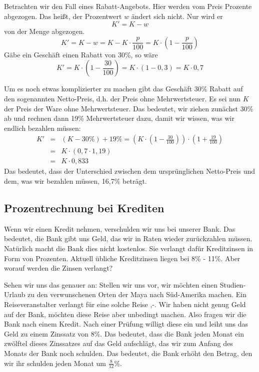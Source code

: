 Betrachten wir den Fall eines Rabatt-Angebots. Hier werden vom Preis Prozente abgezogen. Das heißt, der Prozentwert $w$ ändert sich nicht. Nur wird er
\[
K' = K-w
\]
von der Menge abgezogen.
\[
K' = K-w = K-K\cdot \frac{p}{100} = K\cdot \left(1-\frac{p}{100}\right) 
\]
Gäbe ein Geschäft einen Rabatt von 30\%, so wäre 
\[
K' = K\cdot \left(1-\frac{30}{100}\right) = K\cdot (1-0,3) = K\cdot 0,7
\]

Um es noch etwas komplizierter zu machen gibt das Geschäft 30\% Rabatt auf den sogenannten Netto-Preis, d.h. der Preis ohne Mehrwertsteuer. Es sei nun $K$ der Preis der Ware ohne Mehrwertsteuer. Das bedeutet, wir ziehen zunächst 30\% ab und rechnen dann 19\% Mehrwertsteuer dazu, damit wir wissen, was wir endlich bezahlen müssen:
\begin{eqnarray*}
K' &=& (K-30\% ) + 19\% = \left( K\cdot \left( 1-\frac{30}{100} \right) \right)\cdot \left( 1+\frac{19}{100} \right)\\
&=& K\cdot \left( 0,7 \cdot 1,19 \right)\\
&=& K\cdot 0,833
\end{eqnarray*}
Das bedeutet, dass der Unterschied zwischen dem ursprünglichen Netto-Preis und dem, was wir bezahlen müssen, 16,7\% beträgt.

\subsection{Prozentrechnung bei Krediten}

Wenn wir einen Kredit nehmen, verschulden wir uns bei unserer Bank. Das bedeutet, die Bank gibt uns Geld, das wir in Raten wieder zurückzahlen müssen. Natürlich macht die Bank dies nicht kostenlos. Sie verlangt dafür Kreditzinsen in Form von Prozenten. Aktuell übliche Kreditzinsen liegen bei 8\% - 11\%. Aber worauf werden die Zinsen verlangt?

Sehen wir uns das genauer an: Stellen wir uns vor, wir möchten einen Studien-Urlaub zu den verwunschenen Orten der Maya nach Süd-Amerika machen. Ein Reiseveranstalter verlangt für eine solche Reise ,-. Wir haben nicht genug Geld auf der Bank, möchten diese Reise aber unbedingt machen. Also fragen wir die Bank nach einem Kredit. Nach einer Prüfung willigt diese ein und leiht uns das Geld zu einem Zinssatz von 8\%. Das bedeutet, dass die Bank jeden Monat ein zwölftel dieses Zinssatzes auf das Geld aufschlägt, das wir zum Anfang des Monats der Bank noch schulden. Das bedeutet, die Bank erhöht den Betrag, den wir ihr schulden jeden Monat um $\frac{8}{12}$\%.

